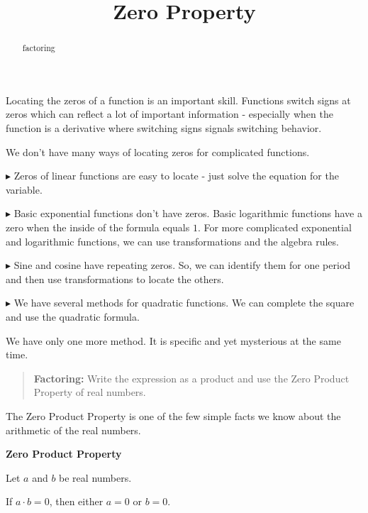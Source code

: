 \documentclass{ximera}
\title{Zero Property}
\begin{document}
\begin{abstract}
factoring
\end{abstract}
\maketitle




Locating the zeros of a function is an important skill.  Functions switch signs at zeros which can reflect a lot of important information  - especially when the function is a derivative where switching signs signals switching behavior.

We don't have many ways of locating zeros for complicated functions.


\textbf{\textcolor{blue!55!black}{$\blacktriangleright$}} Zeros of linear functions are easy to locate - just solve the equation for the variable. 


\textbf{\textcolor{blue!55!black}{$\blacktriangleright$}} Basic exponential functions don't have zeros.  Basic logarithmic functions have a zero when the inside of the formula equals $1$. For more complicated exponential and logarithmic functions, we can use transformations and the algebra rules. 

\textbf{\textcolor{blue!55!black}{$\blacktriangleright$}} Sine and cosine have repeating zeros. So, we can identify them for one period and then use transformations to locate the others. 

\textbf{\textcolor{blue!55!black}{$\blacktriangleright$}} We have several methods for quadratic functions.  We can complete the square and use the quadratic formula. 



We have only one more method.  It is specific and yet mysterious at the same time.



\begin{quote}
\textbf{Factoring: } Write the expression as a product and use the Zero Product Property of real numbers.
\end{quote}



The Zero Product Property is one of the few simple facts we know about the arithmetic of the real numbers.


\begin{definition} \textbf{\textcolor{green!50!black}{Zero Product Property}}  

Let $a$ and $b$ be real numbers. 

If $a \cdot b = 0$, then either $a=0$ or $b=0$.


\end{definition}
\end{document}
